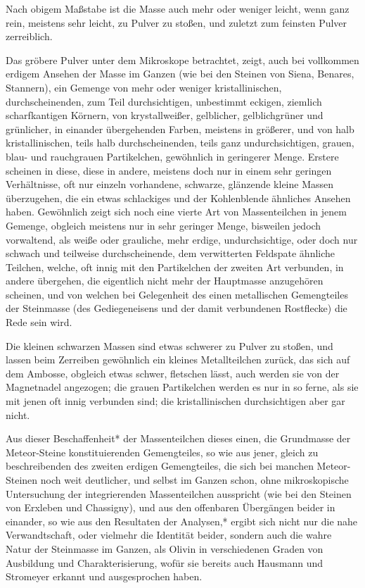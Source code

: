 \documentclass[a4paper, 11pt, oneside, german]{article}
\begin{document}
Nach obigem Maßstabe ist die Masse auch mehr oder weniger leicht, wenn ganz rein, meistens sehr leicht, zu Pulver zu stoßen, und zuletzt zum feinsten Pulver zerreiblich.

Das gröbere Pulver unter dem Mikroskope betrachtet, zeigt, auch bei vollkommen erdigem Ansehen der Masse im Ganzen (wie bei den Steinen von Siena, Benares, Stannern), ein Gemenge von mehr oder weniger kristallinischen, durchscheinenden, zum Teil durchsichtigen, unbestimmt eckigen, ziemlich scharfkantigen Körnern, von krystallweißer, gelblicher, gelblichgrüner und grünlicher, in einander übergehenden Farben, meistens in größerer, und von halb kristallinischen, teils halb durchscheinenden, teils ganz undurchsichtigen, grauen, blau- und rauchgrauen Partikelchen, gewöhnlich in geringerer Menge. Erstere scheinen in diese, diese in andere, meistens doch nur in einem sehr geringen Verhältnisse, oft nur einzeln vorhandene, schwarze, glänzende kleine Massen überzugehen, die ein etwas schlackiges und der Kohlenblende ähnliches Ansehen haben. Gewöhnlich zeigt sich noch eine vierte Art von Massenteilchen in jenem Gemenge, obgleich meistens nur in sehr geringer Menge, bisweilen jedoch vorwaltend, als weiße oder grauliche, mehr erdige, undurchsichtige, oder doch nur schwach und teilweise durchscheinende, dem verwitterten Feldspate ähnliche Teilchen, welche, oft innig mit den Partikelchen der zweiten Art verbunden, in andere übergehen, die eigentlich nicht mehr der Hauptmasse anzugehören scheinen, und von welchen bei Gelegenheit des einen metallischen Gemengteiles der Steinmasse (des Gediegeneisens und der damit verbundenen Rostflecke) die Rede sein wird.

Die kleinen schwarzen Massen sind etwas schwerer zu Pulver zu stoßen, und lassen beim Zerreiben gewöhnlich ein kleines Metallteilchen zurück, das sich auf dem Ambosse, obgleich etwas schwer, fletschen lässt, auch werden sie von der Magnetnadel angezogen; die grauen Partikelchen werden es nur in so ferne, als sie mit jenen oft innig verbunden sind; die kristallinischen durchsichtigen aber gar nicht.

Aus dieser Beschaffenheit* der Massenteilchen dieses einen, die Grundmasse der Meteor-Steine konstituierenden Gemengteiles, so wie aus jener, gleich zu beschreibenden des zweiten erdigen Gemengteiles, die sich bei manchen Meteor-Steinen noch weit deutlicher, und selbst im Ganzen schon, ohne mikroskopische Untersuchung der integrierenden Massenteilchen ausspricht (wie bei den Steinen von Erxleben und Chassigny), und aus den offenbaren Übergängen beider in einander, so wie aus den Resultaten der Analysen,* ergibt sich nicht nur die nahe Verwandtschaft, oder vielmehr die Identität beider, sondern auch die wahre Natur der Steinmasse im Ganzen, als Olivin in verschiedenen Graden von Ausbildung und Charakterisierung, wofür sie bereits auch Hausmann und Stromeyer erkannt und ausgesprochen haben.
\end{document}
